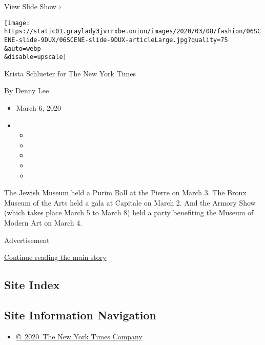 View Slide Show ›

\texttt{[image: https://static01.graylady3jvrrxbe.onion/images/2020/03/08/fashion/06SCENE-slide-9DUX/06SCENE-slide-9DUX-articleLarge.jpg?quality=75\\\&auto=webp\\\&disable=upscale]}

Krista Schlueter for The New York Times

By Denny Lee

\begin{itemize}
\item
  March 6, 2020
\item
  \begin{itemize}
  \item
  \item
  \item
  \item
  \item
  \end{itemize}
\end{itemize}

The Jewish Museum held a Purim Ball at the Pierre on March 3. The Bronx
Museum of the Arts held a gala at Capitale on March 2. And the Armory
Show (which takes place March 5 to March 8) held a party benefiting the
Museum of Modern Art on March 4.

Advertisement

\protect\hyperlink{after-bottom}{Continue reading the main story}

\hypertarget{site-index}{%
\subsection{Site Index}\label{site-index}}

\hypertarget{site-information-navigation}{%
\subsection{Site Information
Navigation}\label{site-information-navigation}}

\begin{itemize}
\tightlist
\item
  \href{https://help.nytimes3xbfgragh.onion/hc/en-us/articles/115014792127-Copyright-notice}{©~2020~The
  New York Times Company}
\end{itemize}

